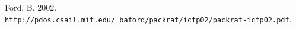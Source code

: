
{\sc Ford, B.} 2002.
\newblock \\{\tt http://pdos.csail.mit.edu/~baford/packrat/icfp02/packrat-icfp02.pdf}.






